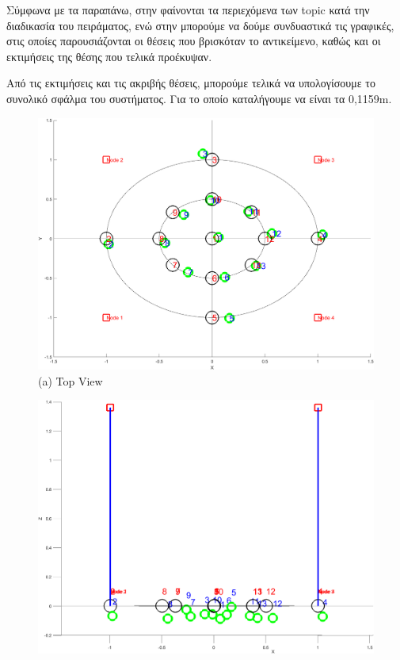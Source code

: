 Σύμφωνα με τα παραπάνω, στην  φαίνονται τα περιεχόμενα των topic κατά την διαδικασία του πειράματος, ενώ στην  μπορούμε να δούμε συνδυαστικά τις γραφικές, στις οποίες παρουσιάζονται οι θέσεις που βρισκόταν το αντικείμενο, καθώς και οι εκτιμήσεις της θέσης που τελικά προέκυψαν.

Από τις εκτιμήσεις και τις ακριβής θέσεις, μπορούμε τελικά να υπολογίσουμε το συνολικό σφάλμα του συστήματος. Για το οποίο καταλήγουμε να είναι τα 0,1159m.

\begin{figure} [H]
	\centering
    \begin{minipage}{.5\textwidth}
      \centering
      \includegraphics[width=0.9\linewidth]{../Images/Experiments-Results/nodes-pos-with-est-up.png}\\
      {(a) Top View}
    \end{minipage}%
    \begin{minipage}{.5\textwidth}
      \centering
      \includegraphics[width=.9\linewidth]{../Images/Experiments-Results/nodes-pos-with-est-side.png}\\

\end{minipage}
\end{figure}
